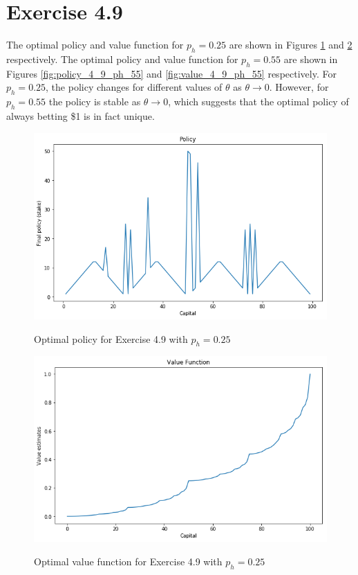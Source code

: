 \documentclass[a4paper,11pt]{article}
\numberwithin{equation}{section}
\theoremstyle{remark}
\begin{document}
\section{Exercise 4.9}

The optimal policy and value function for $p_h = 0.25$ are shown in Figures \ref{fig:policy_4_9_ph_25} and \ref{fig:value_4_9_ph_25} respectively. The optimal policy and value function for $p_h = 0.55$ are shown in Figures \ref{fig:policy_4_9_ph_55} and \ref{fig:value_4_9_ph_55} respectively.
For $p_h = 0.25$, the policy changes for different values of $\theta$ as $\theta \rightarrow 0$. However, for $p_h = 0.55$ the policy is stable as $\theta \rightarrow 0$, which suggests that the optimal policy of always betting \$1 is in fact unique.

\begin{figure}
	\centering
	\caption{Optimal policy for Exercise 4.9 with $p_h = 0.25$}
	\includegraphics[scale=0.75]{policy_4_9_ph_25.png}
	\label{fig:policy_4_9_ph_25}
\end{figure}

\begin{figure}
	\centering
	\caption{Optimal value function for Exercise 4.9 with $p_h = 0.25$}
	\includegraphics[scale=0.75]{value_4_9_ph_25.png}
	\label{fig:value_4_9_ph_25}
\end{figure}
\end{document}
